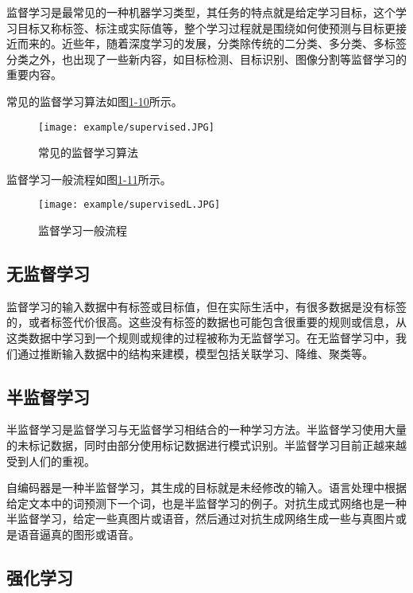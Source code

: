 监督学习是最常见的一种机器学习类型，其任务的特点就是给定学习目标，这个学习目标又称标签、标注或实际值等，整个学习过程就是围绕如何使预测与目标更接近而来的。近些年，随着深度学习的发展，分类除传统的二分类、多分类、多标签分类之外，也出现了一些新内容，如目标检测、目标识别、图像分割等监督学习的重要内容。

常见的监督学习算法如图\href{figure:1-10}{1-10}所示。
\begin{figure}[!htp]

\centering
\texttt{[image: example/supervised.JPG]}
\caption{常见的监督学习算法}
\label{figure:1-9}

\end{figure}

监督学习一般流程如图\href{figure:1-11}{1-11}所示。
\begin{figure}[!htp]
\centering
\texttt{[image: example/supervisedL.JPG]}
\caption{监督学习一般流程}
\label{figure:1-11}
\end{figure}

\subsection{无监督学习}

监督学习的输入数据中有标签或目标值，但在实际生活中，有很多数据是没有标签的，或者标签代价很高。这些没有标签的数据也可能包含很重要的规则或信息，从这类数据中学习到一个规则或规律的过程被称为无监督学习。在无监督学习中，我们通过推断输入数据中的结构来建模，模型包括关联学习、降维、聚类等。

\subsection{半监督学习}

半监督学习是监督学习与无监督学习相结合的一种学习方法。半监督学习使用大量的未标记数据，同时由部分使用标记数据进行模式识别。半监督学习目前正越来越受到人们的重视。

自编码器是一种半监督学习，其生成的目标就是未经修改的输入。语言处理中根据给定文本中的词预测下一个词，也是半监督学习的例子。对抗生成式网络也是一种半监督学习，给定一些真图片或语音，然后通过对抗生成网络生成一些与真图片或是语音逼真的图形或语音。

\subsection{强化学习}

